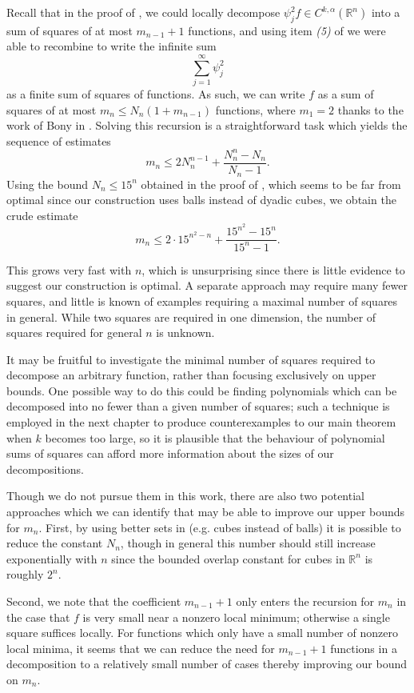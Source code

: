 \documentclass[oneside,hidelinks,indentfirst,10pt]{book}
\begin{document}
Recall that in the proof of , we could locally decompose \(\psi_j^2 f\in C^{k,\alpha}(\mathbb{R}^n)\) into a sum of squares of at most \(m_{n-1}+1\) functions, and using item \textit{(5)} of  we were able to recombine to write the infinite sum
\[
    \sum_{j=1}^\infty\psi_j^2
\]
as a finite sum of squares of functions. As such, we can write \(f\) as a sum of squares of at most \(m_n\leq N_n(1+m_{n-1})\) functions, where \(m_1=2\) thanks to the work of Bony in \cite{Bony2}. Solving this recursion is a straightforward task which yields the sequence of estimates
\[
    m_n\leq 2N_n^{n-1}+\frac{N_n^n-N_n}{N_n-1}.
\]
Using the bound \(N_n\leq 15^n\) obtained in the proof of , which seems to be far from optimal since our construction uses balls instead of dyadic cubes, we obtain the crude estimate
\[
    m_n\leq 2\cdot15^{n^2-n}+\frac{15^{n^2}-15^n}{15^n-1}.
\]


This grows very fast with \(n\), which is unsurprising since there is little evidence to suggest our construction is optimal. A separate approach may require many fewer squares, and little is known of examples requiring a maximal number of squares in general. While two squares are required in one dimension, the number of squares required for general \(n\) is unknown. 


It may be fruitful to investigate the minimal number of squares required to decompose an arbitrary function, rather than focusing exclusively on upper bounds. One possible way to do this could be finding polynomials which can be decomposed into no fewer than a given number of squares; such a technique is employed in the next chapter to produce counterexamples to our main theorem when \(k\) becomes too large, so it is plausible that the behaviour of polynomial sums of squares can afford more information about the sizes of our decompositions.


Though we do not pursue them in this work, there are also  two potential approaches which we can identify that may be able to improve our upper bounds for \(m_n\). First, by using better sets in  (e.g. cubes instead of balls) it is possible to reduce the constant \(N_n\), though in general this number should still increase exponentially with \(n\) since the bounded overlap constant for cubes in \(\mathbb{R}^n\) is roughly \(2^n\).

Second, we note that the coefficient \(m_{n-1}+1\) only enters the recursion for \(m_n\) in the case that \(f\) is very small near a nonzero local minimum; otherwise a single square suffices locally. For functions which only have a small number of nonzero local minima, it seems that we can reduce the need for \(m_{n-1}+1\) functions in a decomposition to a relatively small number of cases thereby improving our bound on \(m_n\).
\end{document}
